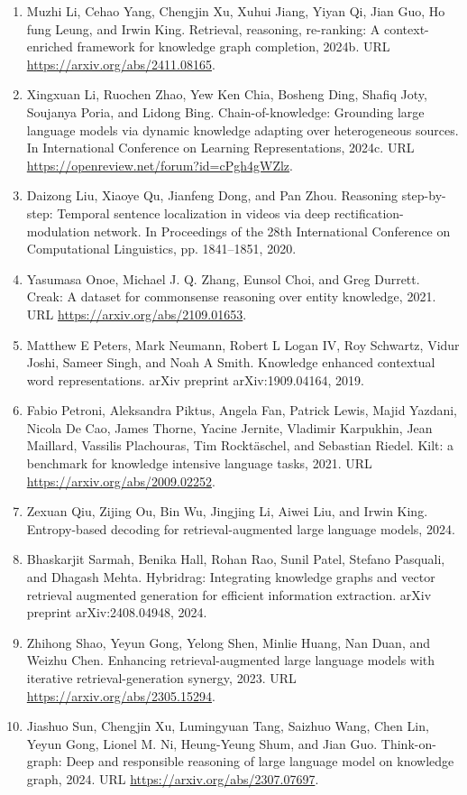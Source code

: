 \documentclass[11pt,UTF8,fontset=fandol]{ctexart}
\begin{document}
\begin{enumerate}[leftmargin=2em]
\item Muzhi Li, Cehao Yang, Chengjin Xu, Xuhui Jiang, Yiyan Qi, Jian Guo, Ho fung Leung, and Irwin King. Retrieval, reasoning, re-ranking: A context-enriched framework for knowledge graph completion, 2024b. URL \url{https://arxiv.org/abs/2411.08165}.
\item Xingxuan Li, Ruochen Zhao, Yew Ken Chia, Bosheng Ding, Shafiq Joty, Soujanya Poria, and Lidong Bing. Chain-of-knowledge: Grounding large language models via dynamic knowledge adapting over heterogeneous sources. In International Conference on Learning Representations, 2024c. URL \url{https://openreview.net/forum?id=cPgh4gWZlz}.
\item Daizong Liu, Xiaoye Qu, Jianfeng Dong, and Pan Zhou. Reasoning step-by-step: Temporal sentence localization in videos via deep rectification-modulation network. In Proceedings of the 28th International Conference on Computational Linguistics, pp. 1841--1851, 2020.
\item Yasumasa Onoe, Michael J. Q. Zhang, Eunsol Choi, and Greg Durrett. Creak: A dataset for commonsense reasoning over entity knowledge, 2021. URL \url{https://arxiv.org/abs/2109.01653}.
\item Matthew E Peters, Mark Neumann, Robert L Logan IV, Roy Schwartz, Vidur Joshi, Sameer Singh, and Noah A Smith. Knowledge enhanced contextual word representations. arXiv preprint arXiv:1909.04164, 2019.
\item Fabio Petroni, Aleksandra Piktus, Angela Fan, Patrick Lewis, Majid Yazdani, Nicola De Cao, James Thorne, Yacine Jernite, Vladimir Karpukhin, Jean Maillard, Vassilis Plachouras, Tim Rocktäschel, and Sebastian Riedel. Kilt: a benchmark for knowledge intensive language tasks, 2021. URL \url{https://arxiv.org/abs/2009.02252}.
\item Zexuan Qiu, Zijing Ou, Bin Wu, Jingjing Li, Aiwei Liu, and Irwin King. Entropy-based decoding for retrieval-augmented large language models, 2024.
\item Bhaskarjit Sarmah, Benika Hall, Rohan Rao, Sunil Patel, Stefano Pasquali, and Dhagash Mehta. Hybridrag: Integrating knowledge graphs and vector retrieval augmented generation for efficient information extraction. arXiv preprint arXiv:2408.04948, 2024.
\item Zhihong Shao, Yeyun Gong, Yelong Shen, Minlie Huang, Nan Duan, and Weizhu Chen. Enhancing retrieval-augmented large language models with iterative retrieval-generation synergy, 2023. URL \url{https://arxiv.org/abs/2305.15294}.
\item Jiashuo Sun, Chengjin Xu, Lumingyuan Tang, Saizhuo Wang, Chen Lin, Yeyun Gong, Lionel M. Ni, Heung-Yeung Shum, and Jian Guo. Think-on-graph: Deep and responsible reasoning of large language model on knowledge graph, 2024. URL \url{https://arxiv.org/abs/2307.07697}.

\end{enumerate}
\end{document}
